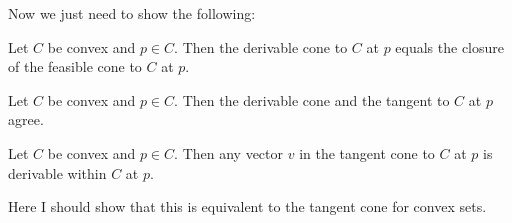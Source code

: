 Now we just need to show the following: 

\begin{lem}
Let $C$ be convex and $p \in C$. Then the derivable cone to $C$ at $p$ equals the closure of the feasible cone to $C$ at $p$.
\end{lem}

\begin{cor}\label{lem:derivConeEqTanCone}
Let $C$ be convex and $p \in C$. Then the derivable cone and the tangent to $C$ at $p$ agree. 
\end{cor}

\begin{lem}
Let $C$ be convex and $p \in C$. Then any vector $v$ in the tangent cone to $C$ at $p$ is derivable within $C$ at $p$.
\end{lem}

Here I should show that this is equivalent to the tangent cone for convex sets. 

